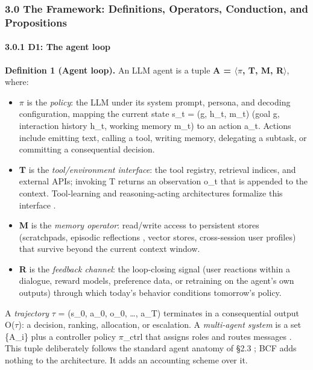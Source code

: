 \documentclass[10pt]{article}
\begin{document}
\subsubsection*{3.0 The Framework: Definitions, Operators, Conduction, and Propositions}

\paragraph*{3.0.1 D1: The agent loop}

\textbf{Definition 1 (Agent loop).} An LLM agent is a tuple \textbf{A = $\langle$$\pi$, T, M, R$\rangle$}, where:

\begin{itemize}
\item \textbf{$\pi$} is the \emph{policy}: the LLM under its system prompt, persona, and decoding configuration, mapping the current state s\_t = (g, h\_t, m\_t) (goal g, interaction history h\_t, working memory m\_t) to an action a\_t. Actions include emitting text, calling a tool, writing memory, delegating a subtask, or committing a consequential decision.
\item \textbf{T} is the \emph{tool/environment interface}: the tool registry, retrieval indices, and external APIs; invoking T returns an observation o\_t that is appended to the context. Tool-learning and reasoning-acting architectures formalize this interface \cite{schick2023toolformer,yao2023react,qu2024tool}.
\item \textbf{M} is the \emph{memory operator}: read/write access to persistent stores (scratchpads, episodic reflections \cite{shinn2023reflexion}, vector stores, cross-session user profiles) that survive beyond the current context window.
\item \textbf{R} is the \emph{feedback channel}: the loop-closing signal (user reactions within a dialogue, reward models, preference data, or retraining on the agent's own outputs) through which today's behavior conditions tomorrow's policy.
\end{itemize}

A \emph{trajectory} $\tau$ = (s\_0, a\_0, o\_0, \ldots{}, a\_T) terminates in a consequential output O($\tau$): a decision, ranking, allocation, or escalation. A \emph{multi-agent system} is a set \{A\_i\} plus a controller policy $\pi$\_ctrl that assigns roles and routes messages \cite{wu2023autogen,guo2024large}. This tuple deliberately follows the standard agent anatomy of \S{}2.3 \cite{wang2024survey,xi2023rise,sumers2024cognitive}; BCF adds nothing to the architecture. It adds an accounting scheme over it.
\end{document}
